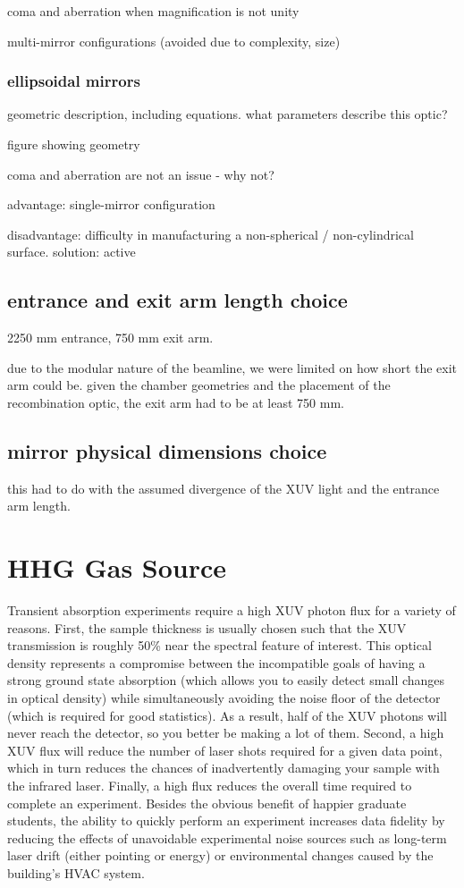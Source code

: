 coma and aberration when magnification is not unity

multi-mirror configurations (avoided due to complexity, size)

\subsubsection{ellipsoidal mirrors}

geometric description, including equations. what parameters describe this optic?

figure showing geometry

coma and aberration are not an issue - why not?

advantage: single-mirror configuration

disadvantage: difficulty in manufacturing a non-spherical / non-cylindrical surface. solution: active


\subsection{entrance and exit arm length choice}
2250 mm entrance, 750 mm exit arm.

due to the modular nature of the beamline, we were limited on how short the exit arm could be. given the chamber geometries and the placement of the recombination optic, the exit arm had to be at least 750 mm. 

\subsection{mirror physical dimensions choice}
this had to do with the assumed divergence of the XUV light and the entrance arm length.

\section{HHG Gas Source}

Transient absorption experiments require a high XUV photon flux for a variety of reasons. First, the sample thickness is usually chosen such that the XUV transmission is roughly 50\% near the spectral feature of interest. This optical density represents a compromise between the incompatible goals of having a strong ground state absorption (which allows you to easily detect small changes in optical density) while simultaneously avoiding the noise floor of the detector (which is required for good statistics). As a result, half of the XUV photons will never reach the detector, so you better be making a lot of them. Second, a high XUV flux will reduce the number of laser shots required for a given data point, which in turn reduces the chances of inadvertently damaging your sample with the infrared laser. Finally, a high flux reduces the overall time required to complete an experiment. Besides the obvious benefit of happier graduate students, the ability to quickly perform an experiment increases data fidelity by reducing the effects of unavoidable experimental noise sources such as long-term laser drift (either pointing or energy) or environmental changes caused by the building's HVAC system.

